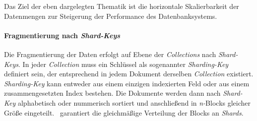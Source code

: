 Das Ziel der eben dargelegten Thematik ist die horizontale Skalierbarkeit der Datenmengen zur Steigerung der Performance des Datenbanksystems.

\paragraph{Fragmentierung nach \textit{Shard-Keys}}\label{sharding-keys}
Die Fragmentierung der Daten erfolgt auf Ebene der \textit{Collections} nach \textit{Shard-Keys}. In jeder \textit{Collection}  muss ein Schlüssel als sogenannter \textit{Sharding-Key} definiert sein, der entsprechend in jedem Dokument derselben \textit{Collection} existiert.  \textit{Sharding-Key} kann entweder aus einem einzigen indexierten Feld oder aus einem zusammengesetzten Index bestehen. Die Dokumente werden dann nach \textit{Shard-Key} alphabetisch oder nummerisch sortiert und anschließend in \textit{n-}Blocks gleicher Größe eingeteilt. \mongo\ garantiert die gleichmäßige Verteilung der Blocks an \textit{Shards}.
